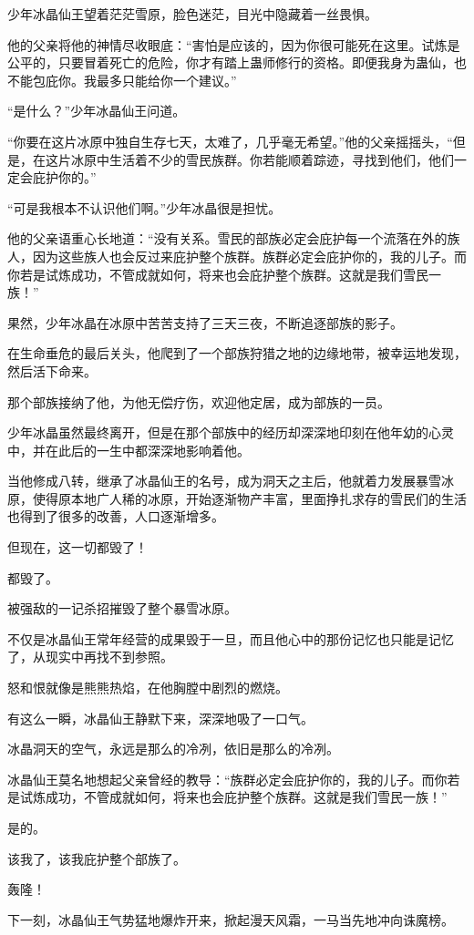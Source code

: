\begin{this_body}
少年冰晶仙王望着茫茫雪原，脸色迷茫，目光中隐藏着一丝畏惧。

他的父亲将他的神情尽收眼底：“害怕是应该的，因为你很可能死在这里。试炼是公平的，只要冒着死亡的危险，你才有踏上蛊师修行的资格。即便我身为蛊仙，也不能包庇你。我最多只能给你一个建议。”

“是什么？”少年冰晶仙王问道。

“你要在这片冰原中独自生存七天，太难了，几乎毫无希望。”他的父亲摇摇头，“但是，在这片冰原中生活着不少的雪民族群。你若能顺着踪迹，寻找到他们，他们一定会庇护你的。”

“可是我根本不认识他们啊。”少年冰晶很是担忧。

他的父亲语重心长地道：“没有关系。雪民的部族必定会庇护每一个流落在外的族人，因为这些族人也会反过来庇护整个族群。族群必定会庇护你的，我的儿子。而你若是试炼成功，不管成就如何，将来也会庇护整个族群。这就是我们雪民一族！”

果然，少年冰晶在冰原中苦苦支持了三天三夜，不断追逐部族的影子。

在生命垂危的最后关头，他爬到了一个部族狩猎之地的边缘地带，被幸运地发现，然后活下命来。

那个部族接纳了他，为他无偿疗伤，欢迎他定居，成为部族的一员。

少年冰晶虽然最终离开，但是在那个部族中的经历却深深地印刻在他年幼的心灵中，并在此后的一生中都深深地影响着他。

当他修成八转，继承了冰晶仙王的名号，成为洞天之主后，他就着力发展暴雪冰原，使得原本地广人稀的冰原，开始逐渐物产丰富，里面挣扎求存的雪民们的生活也得到了很多的改善，人口逐渐增多。

但现在，这一切都毁了！

都毁了。

被强敌的一记杀招摧毁了整个暴雪冰原。

不仅是冰晶仙王常年经营的成果毁于一旦，而且他心中的那份记忆也只能是记忆了，从现实中再找不到参照。

怒和恨就像是熊熊热焰，在他胸膛中剧烈的燃烧。

有这么一瞬，冰晶仙王静默下来，深深地吸了一口气。

冰晶洞天的空气，永远是那么的冷冽，依旧是那么的冷冽。

冰晶仙王莫名地想起父亲曾经的教导：“族群必定会庇护你的，我的儿子。而你若是试炼成功，不管成就如何，将来也会庇护整个族群。这就是我们雪民一族！”

是的。

该我了，该我庇护整个部族了。

轰隆！

下一刻，冰晶仙王气势猛地爆炸开来，掀起漫天风霜，一马当先地冲向诛魔榜。


\end{this_body}
